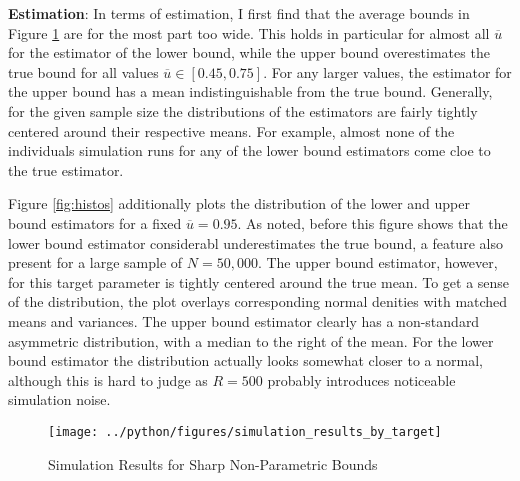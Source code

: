 \documentclass[11pt, a4paper, leqno]{article}
\begin{document}
\textbf{Estimation}: In terms of estimation, I first find that the average bounds in Figure \ref{fig:main_sim_violin} are for the most part too wide. This holds in particular for almost all $\overline{u}$ for the estimator of the lower bound, while the upper bound overestimates the true bound for all values $\overline{u}\in[0.45, 0.75]$. For any larger values, the estimator for the upper bound has a mean indistinguishable from the true bound.
Generally, for the given sample size the distributions of the estimators are fairly tightly centered around their respective means. For example, almost none of the individuals simulation runs for any of the lower bound estimators come cloe to the true estimator.

Figure \ref{fig:histos} additionally plots the distribution of the lower and upper bound estimators for a fixed $\overline{u}=0.95$.
As noted, before this figure shows that the lower bound estimator considerabl underestimates the true bound, a feature also present for a large sample of $N=50,000$.
The upper bound estimator, however, for this target parameter is tightly centered around the true mean.
To get a sense of the distribution, the plot overlays corresponding normal denities with matched means and variances. The upper bound estimator clearly has a non-standard asymmetric distribution, with a median to the right of the mean.
For the lower bound estimator the distribution actually looks somewhat closer to a normal, although this is hard to judge as $R=500$ probably introduces noticeable simulation noise.

\begin{figure}[H]
    \caption{Simulation Results for Sharp Non-Parametric Bounds \label{fig:main_sim_violin}}
    \texttt{[image: ../python/figures/simulation\_results\_by\_target]}
\end{figure}
\end{document}
